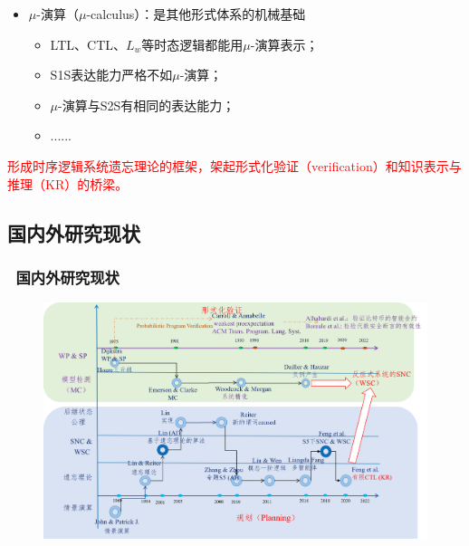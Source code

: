 \documentclass[9pt, CJK]{beamer}
\begin{document}
\begin{frame}
{{\begin{itemize}
\begin{itemize}
\begin{itemize}
						\end{itemize} 
					\end{itemize}
					\item $\mu$-演算（$\mu$-calculus）：是其他形式体系的机械基础
					\begin{itemize}
						\item LTL、CTL、$L_w$等时态逻辑都能用$\mu$-演算表示；
						\item S1S表达能力严格不如$\mu$-演算；
						\item $\mu$-演算与S2S有相同的表达能力；
						\item ......
					\end{itemize}
				\end{itemize}  
				\textcolor{red}{形成时序逻辑系统遗忘理论的框架，架起形式化验证（verification）和知识表示与推理（KR）的桥梁。}}
		}
	\end{frame}
	
	\subsection{国内外研究现状} 
	\begin{frame}
		\frametitle{~国内外研究现状}
		\begin{figure}
			\includegraphics[scale=0.35]{figures/history2}
		\end{figure}
	\end{frame}
	
\end{document}

